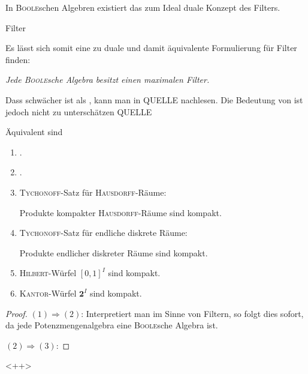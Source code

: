 In \textsc{Boole}schen Algebren existiert das zum Ideal duale Konzept des Filters. 

\begin{defn}
  Filter
\end{defn}

Es lässt sich somit eine zu \PIT duale und damit äquivalente Formulierung für Filter finden:
  \begin{addmargin}[2em]{2em}%
    \textit{Jede \textsc{Boole}sche Algebra besitzt einen maximalen Filter.}
  \end{addmargin}

Dass \PIT schwächer ist als \AC, kann man in QUELLE nachlesen.
Die Bedeutung von \PIT ist jedoch nicht zu unterschätzen QUELLE

\begin{thm}
  Äquivalent sind
\begin{enumerate}[(1)]
    \item \PIT.
    \item \UFT.
    \item \textsc{Tychonoff}-Satz für \textsc{Hausdorff}-Räume: 
      \begin{addmargin}[2em]{2em}%
        Produkte kompakter \textsc{Hausdorff}-Räume sind kompakt.
      \end{addmargin}
    \item \textsc{Tychonoff}-Satz für endliche diskrete Räume: 
      \begin{addmargin}[2em]{2em}%
        Produkte endlicher diskreter Räume sind kompakt.
      \end{addmargin}
    \item \textsc{Hilbert}-Würfel $[0,1]^I$ sind kompakt.
    \item \textsc{Kantor}-Würfel $\mathbf{2}^I$ sind kompakt.
  \end{enumerate}

  \begin{proof}
    $(1)\Rightarrow(2)$: Interpretiert man \PIT im Sinne von Filtern, so folgt dies sofort, da jede Potenzmengenalgebra eine \textsc{Boole}sche Algebra ist.

    $(2)\Rightarrow(3)$:
  \end{proof}<++>

\end{thm}

